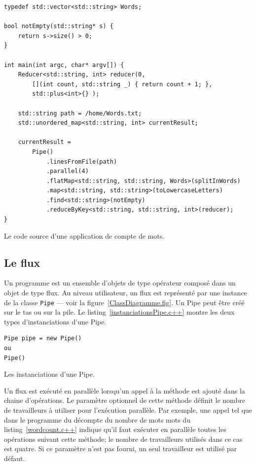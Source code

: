 \begin{Listing}[tbp]
\begin{lstlisting}
typedef std::vector<std::string> Words;

bool notEmpty(std::string* s) {
    return s->size() > 0;
}

int main(int argc, char* argv[]) {
    Reducer<std::string, int> reducer(0, 
    	[](int count, std::string _) { return count + 1; },
        std::plus<int>{} );

   	std::string path = /home/Words.txt; 
	std::unordered_map<std::string, int> currentResult;

	currentResult = 
		Pipe()
			.linesFromFile(path) 
			.parallel(4)
			.flatMap<std::string, std::string, Words>(splitInWords)
			.map<std::string, std::string>(toLowercaseLetters)
			.find<std::string>(notEmpty)
			.reduceByKey<std::string, std::string, int>(reducer);
}
\end{lstlisting}
\caption{Le code source d'une application de compte de mots.}
\label{wordcount.c++}
\end{Listing}


\subsection{Le flux}


Un programme \PpFf{} est un ensemble d'objets de type op\'erateur compos\'e dans un objet de type flux. Au niveau utilisateur, un flux est repr\'esent\'e par une instance de la classe \texttt{Pipe} --- voir la figure~\ref{ClassDiagramme.fig}. Un Pipe peut \^etre cr\'e\'e sur le tas ou sur la pile. Le listing~\ref{instanciationsPipe.c++} montre les deux types d'instanciations d'une Pipe.


\begin{Listing}[tbp]
\begin{lstlisting}
Pipe pipe = new Pipe()
ou
Pipe()
\end{lstlisting}
\caption{Les instanciations d'une Pipe.}
\label{instanciationsPipe.c++}
\end{Listing}

Un flux est ex\'ecut\'e en parall\`ele lorsqu'un appel \`a la m\'ethode  est ajout\'e dans la chaine d'op\'erations. Le param\`etre optionnel de cette m\'ethode d\'efinit le nombre de travailleurs \`a utiliser pour l'ex\'ecution parall\`ele. Par exemple, une appel tel que  dans le programme du d\'ecompte du nombre de mots mots du listing~\ref{wordcount.c++} indique qu'il faut ex\'ecuter en parall\`ele toutes les op\'erations suivant cette m\'ethode;  le nombre de travailleurs utilis\'es dans ce cas est quatre. Si ce param\`etre n'est pas fourni,  un seul travailleur est utilis\'e par d\'efaut. 

